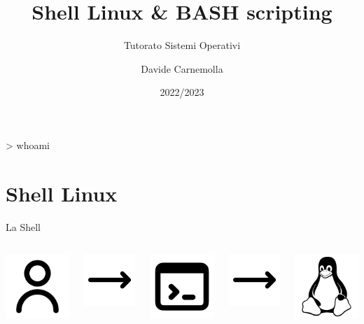 \documentclass{beamer}
\title{Shell Linux \& BASH scripting}
\subtitle{Tutorato Sistemi Operativi}
\author{Davide Carnemolla}
\institute{Dipartimento di Matematica e Informatica \\ Università di Catania}
\date{2022/2023}
\begin{document}
    \begin{frame}
        \maketitle
    \end{frame}

    \begin{frame}{> whoami}
        
    \end{frame}
    
    \section{Shell Linux}

    \begin{frame}{La Shell}
        \begin{columns}[t, onlytextwidth]
                \centering
                \includegraphics[height=2.5cm, keepaspectratio]{images/user.pdf}

                \centering
                \includegraphics[height=2cm, keepaspectratio]{images/rightarrow.pdf}
            
                \centering
                \includegraphics[height=2.5cm,keepaspectratio]{images/terminal.pdf}

                \centering
                \includegraphics[height=2cm, keepaspectratio]{images/rightarrow.pdf}

                \centering
                \includegraphics[height=2.5cm, keepaspectratio]{images/linux.pdf}
        \end{columns}
    \end{frame}
\end{document}
